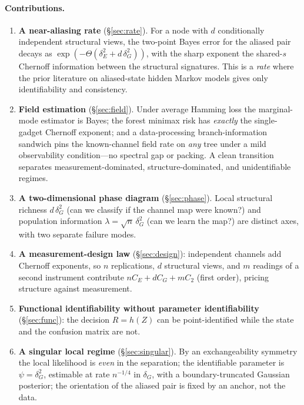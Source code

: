 \documentclass[11pt]{article}
\theoremstyle{plain}
\theoremstyle{definition}\newtheorem{definition}{Definition}\newtheorem{assumption}{Assumption}
\begin{document}
\paragraph{Contributions.}
\begin{enumerate}[leftmargin=*,itemsep=1pt,topsep=2pt]
\item \textbf{A near-aliasing rate} (\S\ref{sec:rate}). For a node with $d$ conditionally independent structural
views, the two-point Bayes error for the aliased pair decays as $\exp(-\Theta(\delta_E^2+d\,\delta_G^2))$, with the
sharp exponent the shared-$s$ Chernoff information between the structural signatures. This is a \emph{rate} where
the prior literature on aliased-state hidden Markov models gives only identifiability and consistency.
\item \textbf{Field estimation} (\S\ref{sec:field}). Under average Hamming loss the marginal-mode estimator is
Bayes; the forest minimax risk has \emph{exactly} the single-gadget Chernoff exponent; and a data-processing
branch-information sandwich pins the known-channel field rate on \emph{any} tree under a mild observability
condition---no spectral gap or packing. A clean transition separates measurement-dominated, structure-dominated,
and unidentifiable regimes.
\item \textbf{A two-dimensional phase diagram} (\S\ref{sec:phase}). Local structural richness $d\,\delta_G^2$
(can we classify if the channel map were known?) and population information $\lambda=\sqrt n\,\delta_G^2$ (can we
learn the map?) are distinct axes, with two separate failure modes.
\item \textbf{A measurement-design law} (\S\ref{sec:design}): independent channels add Chernoff exponents, so
$n$ replications, $d$ structural views, and $m$ readings of a second instrument contribute
$nC_E+dC_G+mC_2$ (first order), pricing structure against measurement.
\item \textbf{Functional identifiability without parameter identifiability} (\S\ref{sec:func}): the decision
$R=h(Z)$ can be point-identified while the state and the confusion matrix are not.
\item \textbf{A singular local regime} (\S\ref{sec:singular}). By an exchangeability symmetry the local likelihood
is \emph{even} in the separation; the identifiable parameter is $\psi=\delta_G^2$, estimable at rate $n^{-1/4}$ in
$\delta_G$, with a boundary-truncated Gaussian posterior; the orientation of the aliased pair is fixed by an
anchor, not the data.
\end{enumerate}
\end{document}
